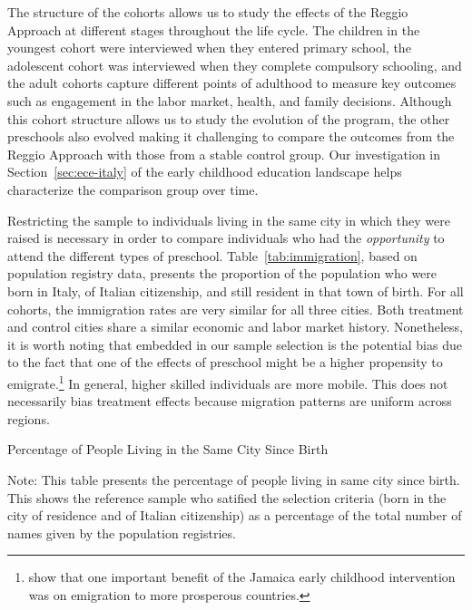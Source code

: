 The structure of the cohorts allows us to study the effects of the Reggio Approach at different stages throughout the life cycle. The children in the youngest cohort were interviewed when they entered primary school, the adolescent cohort was interviewed when they complete compulsory schooling, and the adult cohorts capture different points of adulthood to measure key outcomes such as engagement in the labor market, health, and family decisions. Although this cohort structure allows us to study the evolution of the program, the other preschools also evolved making it challenging to compare the outcomes from the Reggio Approach with those from a stable control group. Our investigation in Section~\ref{sec:ece-italy} of the early childhood education landscape helps characterize the comparison group over time.

Restricting the sample to individuals living in the same city in which they were raised is necessary in order to compare individuals who had the \textit{opportunity} to attend the different types of preschool. Table~\ref{tab:immigration}, based on population registry data, presents the proportion of the population who were born in Italy, of Italian citizenship, and still resident in that town of birth. For all cohorts, the immigration rates are very similar for all three cities. Both treatment and control cities share a similar economic and labor market history. Nonetheless, it is worth noting that embedded in our sample selection is the potential bias due to the fact that one of the effects of preschool might be a higher propensity to emigrate.\footnote{\citet{Gertler_Heckman_etal_2014_Science} show that one important benefit of the Jamaica early childhood intervention was on emigration to more prosperous countries.} In general, higher skilled individuals are more mobile. This does not necessarily bias treatment effects because migration patterns are uniform across regions.

\begin{table}[H]
\centering
\begin{threeparttable}
	\caption{Percentage of People Living in the Same City Since Birth}\label{tab:immigration}
	
\begin{tablenotes}
\footnotesize
Note: This table presents the percentage of people living in same city since birth. This  shows the reference sample who satified the selection criteria (born in the city of residence and of Italian citizenship) as a percentage of the total number of names given by the population registries.
\end{tablenotes}
\end{threeparttable}
\end{table}

